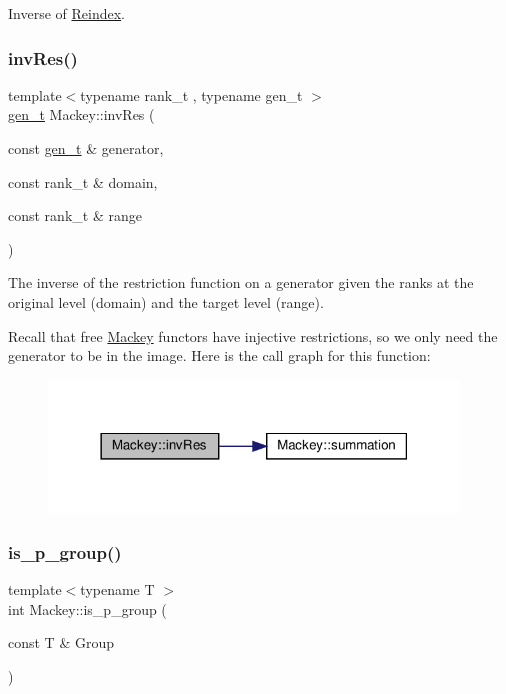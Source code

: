 Inverse of \hyperlink{namespaceMackey_a7da73ade3ee83c4ffd614e79242d7c04}{Reindex}. 

\mbox{\label{namespaceMackey_a30b5667e411ff694aa989e95e394bb41}} 
\subsubsection{\texorpdfstring{inv\+Res()}{invRes()}}
{\footnotesize\ttfamily template$<$typename rank\+\_\+t , typename gen\+\_\+t $>$ \\
\hyperlink{namespaceMackey_a6bb0b2796632ba6c7f8ea192f7aecffe}{gen\+\_\+t} Mackey\+::inv\+Res (\begin{DoxyParamCaption}\item[{const \hyperlink{namespaceMackey_a6bb0b2796632ba6c7f8ea192f7aecffe}{gen\+\_\+t} \&}]{generator,  }\item[{const rank\+\_\+t \&}]{domain,  }\item[{const rank\+\_\+t \&}]{range }\end{DoxyParamCaption})}

The inverse of the restriction function on a generator given the ranks at the original level (domain) and the target level (range).

Recall that free \hyperlink{namespaceMackey}{Mackey} functors have injective restrictions, so we only need the generator to be in the image. Here is the call graph for this function\+:\nopagebreak
\begin{figure}[H]
\begin{center}
\leavevmode
\includegraphics[width=309pt]{namespaceMackey_a30b5667e411ff694aa989e95e394bb41_cgraph}
\end{center}
\end{figure}
\mbox{\label{namespaceMackey_a2b6ac22efe0be546f2c3f8abc2ceb5b7}} 
\subsubsection{\texorpdfstring{is\+\_\+p\+\_\+group()}{is\_p\_group()}}
{\footnotesize\ttfamily template$<$typename T $>$ \\
int Mackey\+::is\+\_\+p\+\_\+group (\begin{DoxyParamCaption}\item[{const T \&}]{Group }\end{DoxyParamCaption})}



